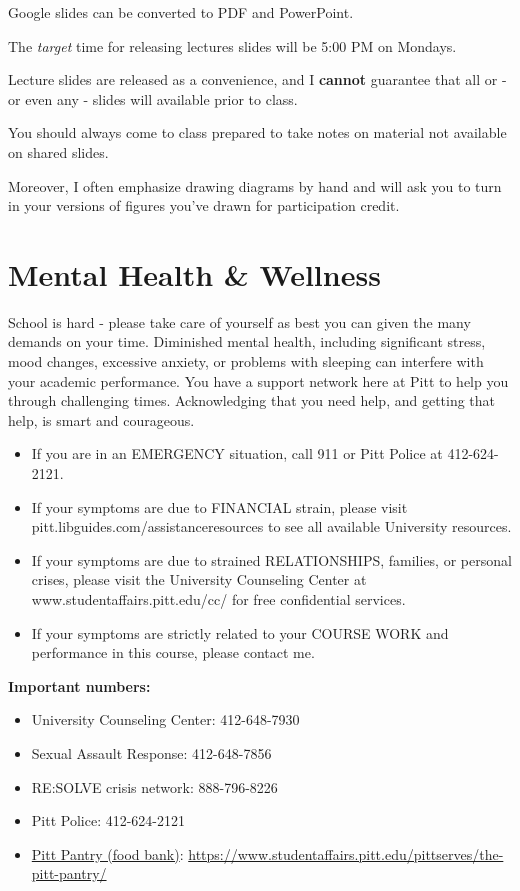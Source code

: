\documentclass[
]{book}
\providecommand{\tightlist}{%
  \setlength{\itemsep}{0pt}\setlength{\parskip}{0pt}}
\begin{document}
Google slides can be converted to PDF and PowerPoint.

The \emph{target} time for releasing lectures slides will be 5:00 PM on Mondays.

Lecture slides are released as a convenience, and I \textbf{cannot} guarantee that all or - or even any - slides will available prior to class.

You should always come to class prepared to take notes on material not available on shared slides.

Moreover, I often emphasize drawing diagrams by hand and will ask you to turn in your versions of figures you've drawn for participation credit.

\hypertarget{mental-health-wellness}{%
\chapter{Mental Health \& Wellness}\label{mental-health-wellness}}

School is hard - please take care of yourself as best you can given the many demands on your time. Diminished mental health, including significant stress, mood changes, excessive anxiety, or problems with sleeping can interfere with your academic performance. You have a support network here at Pitt to help you through challenging times. Acknowledging that you need help, and getting that help, is smart and courageous.

\begin{itemize}
\tightlist
\item
  If you are in an EMERGENCY situation, call 911 or Pitt Police at 412-624-2121.
\item
  If your symptoms are due to FINANCIAL strain, please visit pitt.libguides.com/assistanceresources to see all available University resources.
\item
  If your symptoms are due to strained RELATIONSHIPS, families, or personal crises, please visit the University Counseling Center at www.studentaffairs.pitt.edu/cc/ for free confidential services.
\item
  If your symptoms are strictly related to your COURSE WORK and performance in this course, please contact me.
\end{itemize}

\textbf{Important numbers:}

\begin{itemize}
\tightlist
\item
  University Counseling Center: 412-648-7930
\item
  Sexual Assault Response: 412-648-7856
\item
  RE:SOLVE crisis network: 888-796-8226
\item
  Pitt Police: 412-624-2121
\item
  \href{https://www.studentaffairs.pitt.edu/pittserves/the-pitt-pantry/}{Pitt Pantry (food bank)}: \url{https://www.studentaffairs.pitt.edu/pittserves/the-pitt-pantry/}
\end{itemize}
\end{document}
